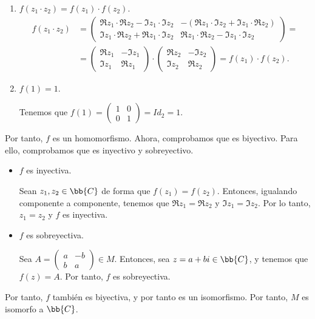 \begin{ejercicio}
\begin{enumerate}
        \item $f(z_1\cdot z_2)=f(z_1)\cdot f(z_2)$.
        \begin{align*}
            f(z_1\cdot z_2) &= \begin{pmatrix}
                \Re z_1\cdot \Re z_2 - \Im z_1\cdot \Im z_2 & -(\Re z_1\cdot \Im z_2 + \Im z_1\cdot \Re z_2) \\
                \Im z_1\cdot \Re z_2 + \Re z_1\cdot \Im z_2 & \Re z_1\cdot \Re z_2 - \Im z_1\cdot \Im z_2
            \end{pmatrix} =\\&=
            \begin{pmatrix} \Re z_1 & -\Im z_1 \\ \Im z_1 & \Re z_1 \end{pmatrix} \cdot \begin{pmatrix} \Re z_2 & -\Im z_2 \\ \Im z_2 & \Re z_2 \end{pmatrix} = f(z_1)\cdot f(z_2).
        \end{align*}

        \item $f(1)=1$.
        
        Tenemos que $f(1)=\begin{pmatrix} 1 & 0 \\ 0 & 1 \end{pmatrix}=Id_2=1$.
    \end{enumerate}

    Por tanto, $f$ es un homomorfismo. Ahora, comprobamos que es biyectivo. Para ello, comprobamos que es inyectivo y sobreyectivo.
    \begin{itemize}
        \item $f$ es inyectiva.
        
        Sean $z_1,z_2\in \bb{C}$ de forma que $f(z_1)=f(z_2)$. Entonces, igualando componente a componente, tenemos que $\Re z_1=\Re z_2$ y $\Im z_1=\Im z_2$. Por lo tanto, $z_1=z_2$ y $f$ es inyectiva.

        \item $f$ es sobreyectiva.
        
        Sea $A=\begin{pmatrix} a & -b \\ b & a \end{pmatrix}\in M$. Entonces, sea $z=a+bi\in \bb{C}$, y tenemos que $f(z)=A$. Por tanto, $f$ es sobreyectiva.
    \end{itemize}

    Por tanto, $f$ también es biyectiva, y por tanto es un isomorfismo. Por tanto, $M$ es isomorfo a $\bb{C}$.
\end{ejercicio}

